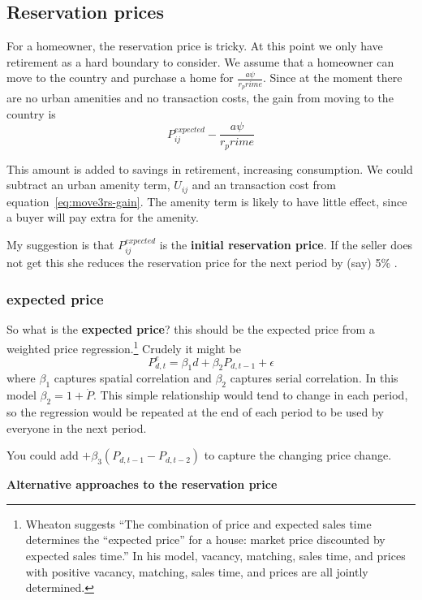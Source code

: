 \subsection{Reservation prices}

For a homeowner, the reservation price is tricky. 
At this point we only have retirement as a hard boundary to consider. We assume that a homeowner can move to the country and purchase a home for $\frac{a\psi}{r_prime}$. Since at the moment there are no urban amenities and no transaction costs, the gain from moving to the country is \begin{equation}
P_{ij}^{expected}-\frac{a\psi}{r_prime}    
\end{equation}\label{eq:movers-gain}

This amount is added to savings in retirement, increasing consumption. 
We could subtract an urban amenity term, $U_{ij}$ and an transaction cost from equation~\ref{eq:move3rs-gain}. The amenity term is likely to have little effect, since a buyer will pay extra for the amenity. 

My suggestion is that $P_{ij}^{expected}$ is the \textbf{initial reservation price}. If the seller does not get this  she reduces the reservation price for the next period by (say) 5\% .

\subsubsection{expected price}
So what is the \textbf{expected price}? this should be the expected price from a weighted price regression.\footnote{Wheaton \cite{wheatonVacancySearchPrices1990} suggests ``The combination of price and expected sales time determines the ``expected price'' for a house: market price discounted by expected sales time.'' In his model, vacancy, matching, sales time, and prices with positive vacancy, matching, sales time, and prices are all jointly determined.} Crudely it might be
\[P_{d,t}^e=\beta_1 d + \beta_2 P_{d,t-1} +\epsilon\]
where $\beta_1$ captures spatial correlation and $\beta_2$ captures serial correlation. In this model $\beta_2=1+\dot P$. This simple relationship would tend to change in each period, so the regression would be repeated  at the end of each period  to be used by everyone in the next period. 

You could add $+ \beta_3 (P_{d,t-1}-P_{d,t-2})$ to capture the changing  price change. 

\textbf{Alternative approaches to the reservation price}

